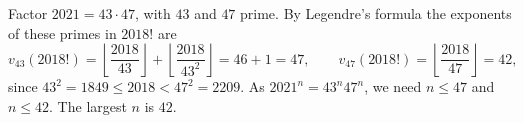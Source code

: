 Factor $2021=43\cdot47$, with $43$ and $47$ prime. By Legendre's formula the exponents of these primes in $2018!$ are
\[
v_{43}(2018!)=\left\lfloor\dfrac{2018}{43}\right\rfloor+\left\lfloor\dfrac{2018}{43^2}\right\rfloor=46+1=47,\qquad
v_{47}(2018!)=\left\lfloor\dfrac{2018}{47}\right\rfloor=42,
\]
since $43^2=1849\le2018<47^2=2209$. As $2021^n=43^n47^n$, we need $n\le47$ and $n\le42$. The largest $n$ is $\boxed{42}$.
